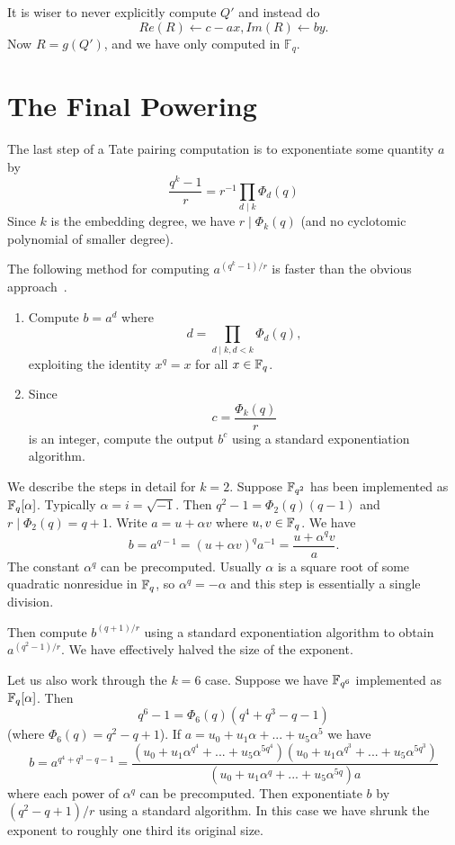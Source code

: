 It is wiser to never explicitly compute $Q'$ and instead do
\[ Re(R) \gets c - a x , Im(R) \gets b y .\]
Now $R = g(Q')$, and we have only computed in $\mathbb{F}_q$.

\section {The Final Powering}

The last step of a Tate pairing computation is
to exponentiate some quantity $a$ by
\[ \frac{q^k-1}{r} = r^{-1} \prod_{d\mid k} \Phi_d(q) \]
Since $k$ is the embedding degree, we have $r \mid \Phi_k(q)$ (and no
cyclotomic polynomial of smaller degree).

The following method for computing $a^{(q^k-1)/r}$ is faster
than the obvious approach~\cite{bakls}.
\begin{enumerate}
\item
Compute $b = a^d $ where
\[ d = \prod_{d\mid k, d<k} \Phi_d(q) , \]
exploiting the identity $x^q = x$ for all $x \in \mathbb{F}_q$.
\item
Since
\[ c = \frac{\Phi_k(q)}{r} \]
is an integer, compute the output $b^c$
using a standard exponentiation algorithm.
\end{enumerate}

We describe the steps in detail
for $k = 2$. Suppose $\mathbb{F}_{q^2}$ has been implemented
as $\mathbb{F}_q[\alpha]$. Typically $\alpha = i = \sqrt{-1}$.
Then $q^2 - 1 = \Phi_2(q)(q-1)$ and
$r \mid \Phi_2(q) = q + 1$. Write $a = u + \alpha v$ where $u,v \in \mathbb{F}_q$.
We have
\[ b = a^{q-1} = (u + \alpha v)^q a^{-1} = \frac{u + \alpha^q v}{a} .\]
The constant $\alpha^q$ can be precomputed. Usually $\alpha$ is a square root
of some quadratic nonresidue in $\mathbb{F}_q$, so $\alpha^q = -\alpha$ and
this step is essentially a single division.

Then compute $b^{(q+1)/r}$ using a standard exponentiation algorithm
to obtain $a^{(q^2-1)/r}$. We have effectively halved the size of the exponent.

Let us also work through the $k = 6$ case. Suppose we have $\mathbb{F}_{q^6}$
implemented as $\mathbb{F}_q[\alpha]$. Then
\[ q^6 - 1 = \Phi_6(q) (q^4 + q^3 - q - 1)\]
(where $\Phi_6(q) = q^2 - q + 1$).
If $a = u_0 + u_1 \alpha + ... + u_5 \alpha^5$ we have
\[ b =
a^{q^4 + q^3 - q - 1}
= \frac{
(u_0 + u_1 \alpha^{q^4} + ... + u_5 \alpha^{5q^4})
(u_0 + u_1 \alpha^{q^3} + ... + u_5 \alpha^{5q^3})}
{
(u_0 + u_1 \alpha^q + ... + u_5 \alpha^{5q})a
}
\]
where each power of $\alpha^q$ can be precomputed. Then exponentiate $b$
by $(q^2 - q + 1)/r$ using a standard algorithm.
In this case we have shrunk the exponent to roughly one third its original
size.

